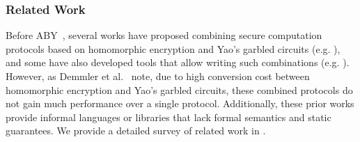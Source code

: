 \subsubsection*{Related Work}
Before ABY~\cite{aby}, several works have proposed
combining secure computation protocols based on homomorphic
encryption and Yao's garbled circuits
(e.g. \cite{barni,blanton,brickell,franz,huang,valeriaMatrix,valeriaRidge,schropferK11}),
and some have also developed tools that allow writing such
combinations (e.g. \cite{bogdanov,lone,tasty,autoS}). However, as Demmler et
al.~\cite{aby} note, due
 to high conversion cost between
homomorphic encryption and Yao's garbled circuits, these combined
protocols do not gain much performance over a single
protocol. 
Additionally, these prior works provide informal languages
or libraries that lack formal semantics and static guarantees.
 We provide a detailed survey of related
work in .




